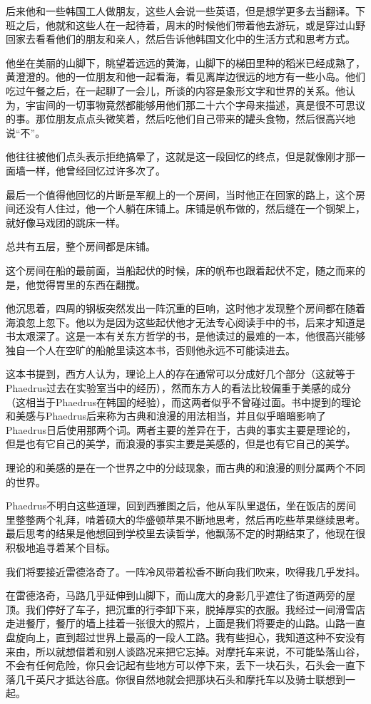 \documentclass[UTF8]{article}
\begin{document}
\par 后来他和一些韩国工人做朋友，这些人会说一些英语，但是想学更多去当翻译。下班之后，他就和这些人在一起待着，周末的时候他们带着他去游玩，或是穿过山野回家去看看他们的朋友和亲人，然后告诉他韩国文化中的生活方式和思考方式。
\par 他坐在美丽的山脚下，眺望着远远的黄海，山脚下的梯田里种的稻米已经成熟了，黄澄澄的。他的一位朋友和他一起看海，看见离岸边很远的地方有一些小岛。他们吃过午餐之后，在一起聊了一会儿，所谈的内容是象形文字和世界的关系。他认为，宇宙间的一切事物竟然都能够用他们那二十六个字母来描述，真是很不可思议的事。那位朋友点点头微笑着，然后吃他们自己带来的罐头食物，然后很高兴地说“不”。
\par 他往往被他们点头表示拒绝搞晕了，这就是这一段回忆的终点，但是就像刚才那一面墙一样，他曾经回忆过许多次了。
\par 最后一个值得他回忆的片断是军舰上的一个房间，当时他正在回家的路上，这个房间还没有人住过，他一个人躺在床铺上。床铺是帆布做的，然后缝在一个钢架上，就好像马戏团的跳床一样。
\par 总共有五层，整个房间都是床铺。
\par 这个房间在船的最前面，当船起伏的时候，床的帆布也跟着起伏不定，随之而来的是，他觉得胃里的东西在翻搅。
\par 他沉思着，四周的钢板突然发出一阵沉重的巨响，这时他才发现整个房间都在随着海浪忽上忽下。他以为是因为这些起伏他才无法专心阅读手中的书，后来才知道是书太艰深了。这是一本有关东方哲学的书，是他读过的最难的一本，他很高兴能够独自一个人在空旷的船舱里读这本书，否则他永远不可能读进去。
\par 这本书提到，西方人认为，理论上人的存在通常可以分成好几个部分（这就等于Phaedrus过去在实验室当中的经历），然而东方人的看法比较偏重于美感的成分（这相当于Phaedrus在韩国的经验），而这两者似乎不曾碰过面。书中提到的理论和美感与Phaedrus后来称为古典和浪漫的用法相当，并且似乎暗暗影响了Phaedrus日后使用那两个词。两者主要的差异在于，古典的事实主要是理论的，但是也有它自己的美学，而浪漫的事实主要是美感的，但是也有它自己的美学。
\par 理论的和美感的是在一个世界之中的分歧现象，而古典的和浪漫的则分属两个不同的世界。
\par Phaedrus不明白这些道理，回到西雅图之后，他从军队里退伍，坐在饭店的房间里整整两个礼拜，啃着硕大的华盛顿苹果不断地思考，然后再吃些苹果继续思考。最后思考的结果是他想回到学校里去读哲学，他飘荡不定的时期结束了，他现在很积极地追寻着某个目标。
\par 我们将要接近雷德洛奇了。一阵冷风带着松香不断向我们吹来，吹得我几乎发抖。
\par 在雷德洛奇，马路几乎延伸到山脚下，而山庞大的身影几乎遮住了街道两旁的屋顶。我们停好了车子，把沉重的行李卸下来，脱掉厚实的衣服。我经过一间滑雪店走进餐厅，餐厅的墙上挂着一张很大的照片，上面是我们将要走的山路。山路一直盘旋向上，直到超过世界上最高的一段人工路。我有些担心，我知道这种不安没有来由，所以就想借着和别人谈路况来把它忘掉。对摩托车来说，不可能坠落山谷，不会有任何危险，你只会记起有些地方可以停下来，丢下一块石头，石头会一直下落几千英尺才抵达谷底。你很自然地就会把那块石头和摩托车以及骑士联想到一起。
\end{document}
